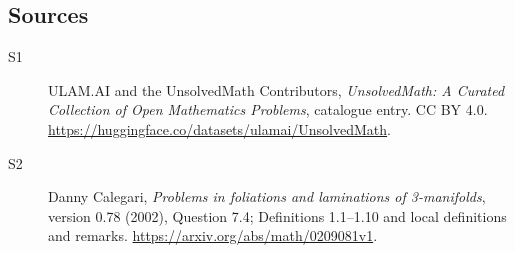\documentclass[11pt]{article}
\begin{document}
\subsection{Sources}
\begin{description}
\item[\hypertarget{source:statement:1}{S1}] ULAM.AI and the UnsolvedMath Contributors, \emph{UnsolvedMath: A Curated Collection of Open Mathematics Problems}, catalogue entry. CC BY 4.0. \url{https://huggingface.co/datasets/ulamai/UnsolvedMath}.
\item[\hypertarget{source:statement:2}{S2}] Danny Calegari, \emph{Problems in foliations and laminations of 3-manifolds}, version 0.78 (2002), Question 7.4; Definitions 1.1--1.10 and local definitions and remarks. \url{https://arxiv.org/abs/math/0209081v1}.
\end{description}
\label{end:statement}
\end{document}
